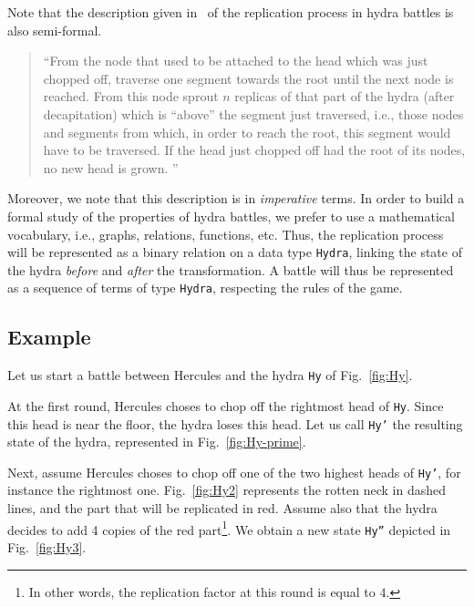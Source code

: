 \documentclass[a4paper]{book}
\begin{document}
Note that the description given in~\cite{KP82} of the replication process in hydra battles is also  semi-formal. 

\label{original-rules}

\begin{quote}
  ``From the node that used to be attached to the head which was just chopped off, traverse one 
segment towards the root until the next node is reached. From this node sprout $n$ replicas of 
that part of the hydra (after decapitation) which is ``above'' the segment just traversed, i.e., those 
nodes and segments from which, in order to reach the root, this segment would have to be 
traversed. If the head just chopped off had the root of its nodes, no new head is grown. ''
\end{quote}

Moreover, we note that this description is in \emph{imperative} terms. In order to build a formal  study of the properties of hydra battles, we prefer to use a mathematical vocabulary, i.e., graphs, relations, functions, etc.
Thus, the replication process will be represented as a binary relation on a data type \texttt{Hydra},
linking the state of the hydra \emph{before} and \emph{after} the transformation.
A battle will thus be represented as a sequence of terms of type \texttt{Hydra}, respecting the rules of the game.





\subsection{Example}
Let us start a battle between Hercules and the hydra \texttt{Hy} of Fig.~\ref{fig:Hy}.

At the first round, Hercules choses to chop off the rightmost head of \texttt{Hy}.
Since this head is near the floor, the hydra loses this head. Let us call 
 \texttt{Hy'} the resulting state of the hydra, represented in Fig.~\vref{fig:Hy-prime}.

Next, assume Hercules choses to chop off one of the two highest heads of \texttt{Hy'}, for instance the rightmost one. Fig.~\vref{fig:Hy2} represents the rotten neck in dashed lines, and the part that will be replicated in red. Assume also that the hydra decides to add 4 copies of the red part\footnote{In other words, the replication factor at this round is equal to $4$.}. We obtain a new state \texttt{Hy''} depicted in Fig.~\ref{fig:Hy3}.
\end{document}
